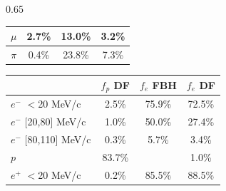 \documentclass{beamer}
\begin{document}
\begin{frame}
\begin{columns}
\begin{column}{0.65\framewidth}
\begin{table}[h!]
\begin{tabular}{| c | c | c | c|}
        \hline
        {\scriptsize $\mu$} &  {\scriptsize 2.7\%}  & {\scriptsize 13.0\%} & {\scriptsize 3.2\%}\\
        \hline
        {\scriptsize $\pi$} & {\scriptsize 0.4\%} & {\scriptsize 23.8\%} & {\scriptsize 7.3\%} \\
        \hline
        \end{tabular}
        \label{tab:0bbpbar}
        \end{table}
        \vspace{-6mm}
        \begin{table}[h!]
    \centering
            \hspace*{-0.5em}
    \renewcommand{\arraystretch}{0.7}
    \begin{tabular}{| l | c | c | c |} 
    \hline
    &    {\scriptsize $f_{p}$ DF} & {\scriptsize $f_{e}$ FBH } & {\scriptsize $f_{e}$ DF} \\
    \hline
    {\scriptsize $e^-$} {\tiny$<$20 MeV/c}      & {\scriptsize 2.5\%}   & {\scriptsize 75.9\%} & {\scriptsize 72.5\%}\\
    \hline
    {\scriptsize $e^-$} {\tiny[20,80] MeV/c}  & {\scriptsize 1.0\%}   & {\scriptsize 50.0\%} & {\scriptsize 27.4\%} \\
    \hline
    {\scriptsize $e^-$} {\tiny[80,110] MeV/c}  & {\scriptsize 0.3\%}  &  {\scriptsize 5.7\%} & {\scriptsize 3.4\%}\\
    \hline
    {\scriptsize $p$}       &         {\scriptsize 83.7\%}   &  & {\scriptsize 1.0\%}\\
    \hline
    {\scriptsize $e^+$} {\tiny$<$20 MeV/c} & {\scriptsize 0.2\%}    &   {\scriptsize 85.5\%}& {\scriptsize 88.5\%}\\
    \hline


\end{tabular}
\end{table}
\end{column}
\end{columns}
\end{frame}
\end{document}
